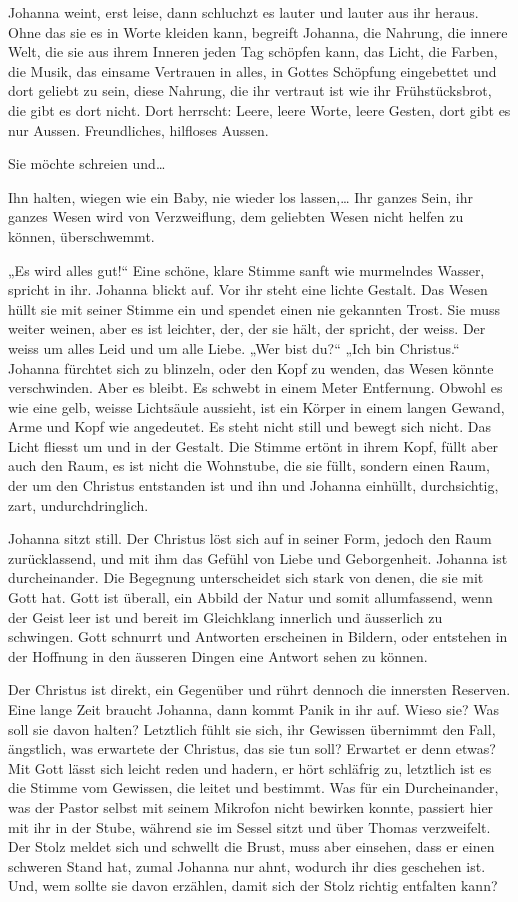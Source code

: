 \documentclass[10pt,titlepage,a5paper]{book}
\begin{document}
Johanna weint, erst leise, dann schluchzt es lauter und lauter aus ihr heraus. Ohne das sie es in Worte kleiden kann, begreift Johanna, die Nahrung, die innere Welt, die sie aus ihrem Inneren jeden Tag schöpfen kann, das Licht, die Farben, die Musik, das einsame Vertrauen in alles, in Gottes Schöpfung eingebettet und dort geliebt zu sein, diese Nahrung, die ihr vertraut ist wie ihr Frühstücksbrot, die gibt es dort nicht. Dort herrscht: Leere, leere Worte, leere Gesten, dort gibt es nur Aussen. Freundliches, hilfloses Aussen.

Sie möchte schreien und\dots 

Ihn halten, wiegen wie ein Baby, nie wieder los lassen,\dots 
Ihr ganzes Sein, ihr ganzes Wesen wird von Verzweiflung, dem geliebten Wesen nicht helfen zu können, überschwemmt.

„Es wird alles gut!“ Eine schöne, klare Stimme sanft wie murmelndes Wasser, spricht in ihr. Johanna blickt auf. Vor ihr steht eine lichte Gestalt. Das Wesen hüllt sie mit seiner Stimme ein und spendet einen nie gekannten Trost. Sie muss weiter weinen, aber es ist leichter, der, der sie hält, der spricht, der weiss. Der weiss um alles Leid und um alle Liebe. „Wer bist du?“ „Ich bin Christus.“ Johanna fürchtet sich zu blinzeln, oder den Kopf zu wenden, das Wesen könnte verschwinden. Aber es bleibt. Es schwebt in einem Meter Entfernung. Obwohl es wie eine gelb, weisse Lichtsäule aussieht, ist ein Körper in einem langen Gewand, Arme und Kopf wie angedeutet.  Es steht nicht still und bewegt sich nicht. Das Licht fliesst um und in der Gestalt. Die Stimme ertönt in ihrem Kopf, füllt aber auch den Raum, es ist nicht die Wohnstube, die sie füllt, sondern einen Raum, der um den Christus entstanden ist und ihn und Johanna einhüllt, durchsichtig, zart, undurchdringlich.

Johanna sitzt still. Der Christus löst sich auf in seiner Form, jedoch den Raum zurücklassend, und mit ihm das Gefühl von Liebe und Geborgenheit. 
Johanna ist durcheinander. Die Begegnung unterscheidet sich stark von denen, die sie mit Gott hat. Gott ist überall, ein Abbild der Natur und somit allumfassend, wenn der Geist leer ist und bereit im Gleichklang innerlich und äusserlich zu schwingen. Gott schnurrt und Antworten erscheinen in Bildern, oder entstehen in der Hoffnung in den äusseren Dingen eine Antwort sehen zu können.

Der Christus ist direkt, ein Gegenüber und rührt dennoch die innersten Reserven. Eine lange Zeit braucht Johanna, dann kommt Panik in ihr auf. Wieso sie? Was soll sie davon halten? Letztlich fühlt sie sich, ihr Gewissen übernimmt den Fall, ängstlich, was erwartete der Christus, das sie tun soll? Erwartet er denn etwas? Mit Gott lässt sich leicht reden und hadern, er hört schläfrig zu, letztlich ist es die Stimme vom Gewissen, die leitet und bestimmt. Was für ein Durcheinander, was der Pastor selbst mit seinem Mikrofon nicht bewirken konnte, passiert hier mit ihr in der Stube, während sie im Sessel sitzt und über Thomas verzweifelt. Der Stolz meldet sich und schwellt die Brust, muss aber einsehen, dass er einen schweren Stand hat, zumal Johanna nur ahnt, wodurch ihr dies geschehen ist. Und, wem sollte sie davon erzählen, damit sich der Stolz richtig entfalten kann?
\end{document}
